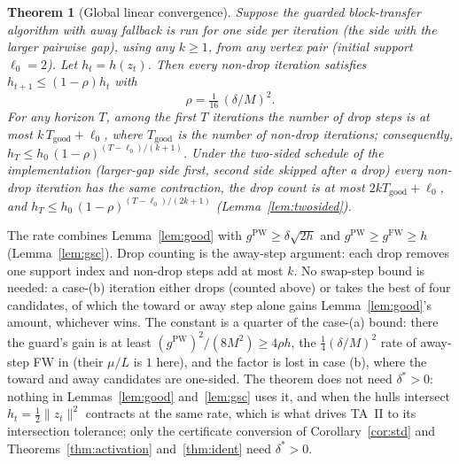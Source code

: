 \documentclass[pdflatex,sn-apa]{sn-jnl}%
\newtheorem{theorem}{Theorem}
\theoremstyle{thmstyleone}
\newtheorem{theorem}{Theorem}
\theoremstyle{thmstyletwo}
\newcommand{\norm}[1]{\lVert #1 \rVert}
\newcommand{\gFW}{g^{\mathrm{FW}}}
\newcommand{\gPW}{g^{\mathrm{PW}}}
\begin{document}
\begin{theorem}[Global linear convergence]\label{thm:linear}
Suppose the guarded block-transfer algorithm with away fallback is run
for one side per iteration (the side with the larger pairwise gap),
using any $k\ge1$, from any vertex pair (initial support $\ell_0=2$).
Let $h_t=h(z_t)$. Then every non-drop iteration satisfies
$h_{t+1}\le(1-\rho)h_t$ with
\[
\rho=\tfrac1{16}\,(\delta/M)^2 .
\]
For any horizon $T$, among the first $T$ iterations the number of drop
steps is at most
$k\,T_{\mathrm{good}}+\ell_0$, where $T_{\mathrm{good}}$ is the number of
non-drop iterations; consequently,
$h_T\le h_0\,(1-\rho)^{(T-\ell_0)/(k+1)}$. Under the two-sided
schedule of the implementation (larger-gap side first, second side
skipped after a drop) every non-drop iteration has the same
contraction, the drop count is at most $2kT_{\mathrm{good}}+\ell_0$, and
$h_T\le h_0\,(1-\rho)^{(T-\ell_0)/(2k+1)}$ (Lemma~\ref{lem:twosided}).
\end{theorem}
The rate combines Lemma~\ref{lem:good} with $\gPW\ge\delta\sqrt{2h}$
and $\gPW\ge\gFW\ge h$ (Lemma~\ref{lem:gsc}). Drop counting is the away-step argument: each
drop removes one support index and non-drop steps add at most $k$.
No swap-step bound is needed: a case-(b) iteration either drops
(counted above) or takes the best of four candidates, of which the
toward or away step alone gains Lemma~\ref{lem:good}'s amount,
whichever wins. The constant is a quarter of the case-(a) bound: there
the guard's gain is at least $(\gPW)^2/(8M^2)\ge4\rho h$, the $\tfrac14(\delta/M)^2$ rate of away-step FW in \citet{lj2015}
(their $\mu/L$ is $1$ here), and
the factor is lost in case (b), where the toward and away candidates
are one-sided. The theorem does not need $\delta^*>0$: nothing in
Lemmas~\ref{lem:good} and~\ref{lem:gsc} uses it, and when the hulls
intersect $h_t=\tfrac12\norm{z_t}^2$ contracts at the same rate, which
is what drives TA~II to its intersection tolerance; only the
certificate conversion of Corollary~\ref{cor:std} and
Theorems~\ref{thm:activation} and~\ref{thm:ident} need $\delta^*>0$.
\end{document}
